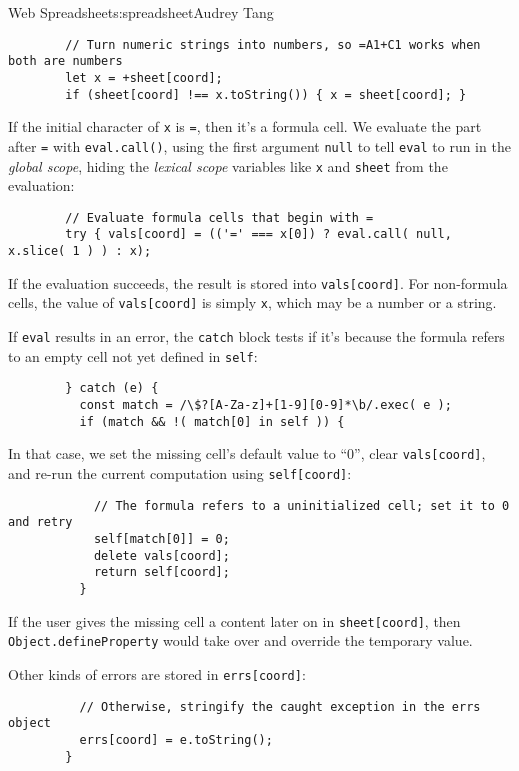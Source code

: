 \begin{aosachapter}{Web Spreadsheet}{s:spreadsheet}{Audrey Tang}
\begin{verbatim}
        // Turn numeric strings into numbers, so =A1+C1 works when both are numbers
        let x = +sheet[coord];
        if (sheet[coord] !== x.toString()) { x = sheet[coord]; }
\end{verbatim}

If the initial character of \texttt{x} is \texttt{=}, then it's a
formula cell. We evaluate the part after \texttt{=} with
\texttt{eval.call()}, using the first argument \texttt{null} to tell
\texttt{eval} to run in the \emph{global scope}, hiding the
\emph{lexical scope} variables like \texttt{x} and \texttt{sheet} from
the evaluation:

\begin{verbatim}
        // Evaluate formula cells that begin with =
        try { vals[coord] = (('=' === x[0]) ? eval.call( null, x.slice( 1 ) ) : x);
\end{verbatim}

If the evaluation succeeds, the result is stored into
\texttt{vals{[}coord{]}}. For non-formula cells, the value of
\texttt{vals{[}coord{]}} is simply \texttt{x}, which may be a number or
a string.

If \texttt{eval} results in an error, the \texttt{catch} block tests if
it's because the formula refers to an empty cell not yet defined in
\texttt{self}:

\begin{verbatim}
        } catch (e) {
          const match = /\$?[A-Za-z]+[1-9][0-9]*\b/.exec( e );
          if (match && !( match[0] in self )) {
\end{verbatim}

In that case, we set the missing cell's default value to ``0'', clear
\texttt{vals{[}coord{]}}, and re-run the current computation using
\texttt{self{[}coord{]}}:

\begin{verbatim}
            // The formula refers to a uninitialized cell; set it to 0 and retry
            self[match[0]] = 0;
            delete vals[coord];
            return self[coord];
          }
\end{verbatim}

If the user gives the missing cell a content later on in
\texttt{sheet{[}coord{]}}, then \texttt{Object.defineProperty} would
take over and override the temporary value.

Other kinds of errors are stored in \texttt{errs{[}coord{]}}:

\begin{verbatim}
          // Otherwise, stringify the caught exception in the errs object
          errs[coord] = e.toString();
        }
\end{verbatim}


\end{aosachapter}
